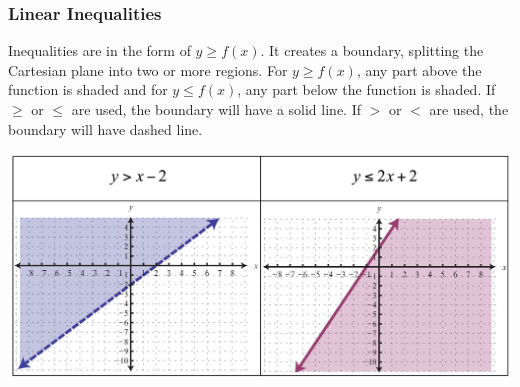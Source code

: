 \subsubsection{Linear Inequalities}
Inequalities are in the form of $y\geq f(x)$. It creates a boundary, splitting the Cartesian plane into two or more regions. For $y\geq f(x)$, any part above the function is shaded and for $y\leq f(x)$, any part below the function is shaded. If $\geq$ or $\leq$ are used, the boundary will have a solid line. If $>$ or $<$ are used, the boundary will have dashed line.\\
\centerline{\includegraphics[scale = 0.3]{PreCalcPictures/LinearInequalities.jpg}}